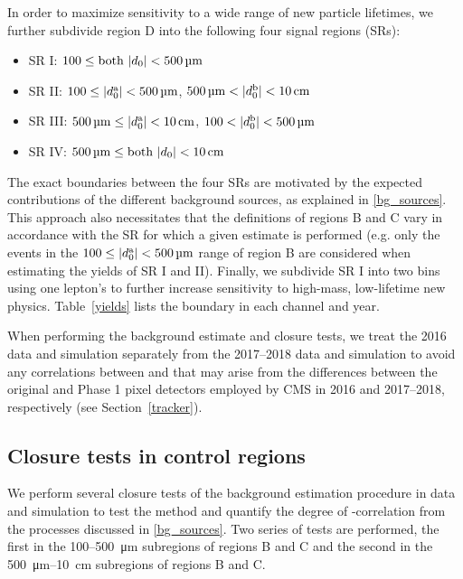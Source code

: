 In order to maximize sensitivity to a wide range of new particle lifetimes, we further subdivide region D into the following four signal regions (SRs):
\begin{itemize}
    \item SR I: $\num{100}\leq\text{both }\ad<\SI{500}{\um}$
    \item SR II: $\num{100}\leq\ada<\SI{500}{\um}$, $\SI{500}{\um}<\adb<\SI{10}{\cm}$
    \item SR III: $\SI{500}{\um} \leq \ada<\SI{10}{\cm}$, $\num{100} < \adb<\SI{500}{\um}$
    \item SR IV: $\SI{500}{\um} \leq \text{both }\ad<\SI{10}{\cm}$
\end{itemize}
The exact boundaries between the four SRs are motivated by the expected contributions of the different background sources, as explained in \ref{bg_sources}. This approach also necessitates that the definitions of regions B and C vary in accordance with the SR for which a given estimate is performed (e.g. only the events in the $\num{100}\leq\ada<\SI{500}{\um}$ range of region B are considered when estimating the yields of SR I and II). Finally, we subdivide SR I into two bins using one lepton's \pt to further increase sensitivity to high-mass, low-lifetime new physics. Table~\ref{yields} lists the \pt boundary in each channel and year.

When performing the background estimate and closure tests, we treat the 2016 data and simulation separately from the 2017--2018 data and simulation to avoid any correlations between \ada and \adb that may arise from the differences between the original and Phase 1 pixel detectors employed by CMS in 2016 and 2017--2018, respectively (see Section~\ref{tracker}).

\subsection{Closure tests in control regions}
\label{cr_closure_tests}

We perform several closure tests of the background estimation procedure in data and simulation to test the method and quantify the degree of \ada-\adb correlation from the processes discussed in \ref{bg_sources}. Two series of tests are performed, the first in the \num{100}--\SI{500}{\um} subregions of regions B and C and the second in the \SI{500}{\um}--\SI{10}{\cm} subregions of regions B and C.


